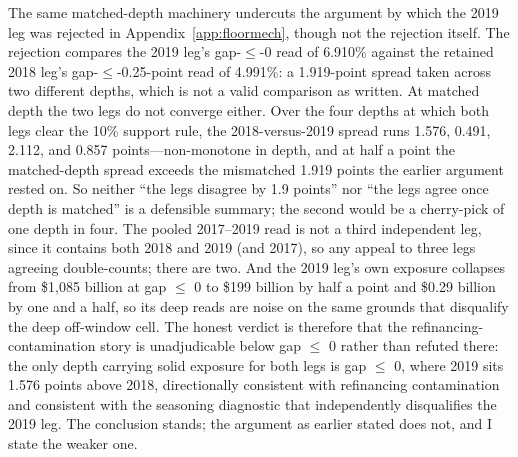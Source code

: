 \documentclass[12pt]{article}
\begin{document}
The same matched-depth machinery undercuts the argument by which the 2019 leg was rejected in Appendix~\ref{app:floormech}, though not the rejection itself. The rejection compares the 2019 leg's gap-$\leq$-0 read of 6.910\% against the retained 2018 leg's gap-$\leq$-0.25-point read of 4.991\%: a 1.919-point spread taken across two different depths, which is not a valid comparison as written. At matched depth the two legs do not converge either. Over the four depths at which both legs clear the 10\% support rule, the 2018-versus-2019 spread runs 1.576, 0.491, 2.112, and 0.857 points---non-monotone in depth, and at half a point the matched-depth spread exceeds the mismatched 1.919 points the earlier argument rested on. So neither ``the legs disagree by 1.9 points'' nor ``the legs agree once depth is matched'' is a defensible summary; the second would be a cherry-pick of one depth in four. The pooled 2017--2019 read is not a third independent leg, since it contains both 2018 and 2019 (and 2017), so any appeal to three legs agreeing double-counts; there are two. And the 2019 leg's own exposure collapses from \$1{,}085 billion at gap $\leq$ 0 to \$199 billion by half a point and \$0.29 billion by one and a half, so its deep reads are noise on the same grounds that disqualify the deep off-window cell. The honest verdict is therefore that the refinancing-contamination story is unadjudicable below gap $\leq$ 0 rather than refuted there: the only depth carrying solid exposure for both legs is gap $\leq$ 0, where 2019 sits 1.576 points above 2018, directionally consistent with refinancing contamination and consistent with the seasoning diagnostic that independently disqualifies the 2019 leg. The conclusion stands; the argument as earlier stated does not, and I state the weaker one.
\end{document}
